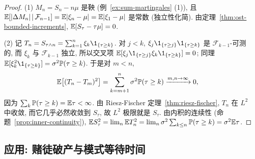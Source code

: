\begin{proof}
(1) $M_n=S_n-n\mu$ 是鞅 (例~\ref{ex:sum-martingales} (1)), 且 $\mathbb{E}[\lvert\Delta M_n\rvert\,|\,\mathcal{F}_{n-1}]=\mathbb{E}\lvert\xi_n-\mu\rvert=\mathbb{E}\lvert\xi_1-\mu\rvert$ 是常数 (独立性化简). 由定理~\ref{thm:ost-bounded-increments}, $\mathbb{E}[S_\tau-\tau\mu]=0$.

(2) 记 $T_n=S_{\tau\wedge n}=\sum_{k=1}^n\xi_k\1_{\{\tau\ge k\}}$. 对 $j<k$, $\xi_j\1_{\{\tau\ge j\}}\1_{\{\tau\ge k\}}$ 是 $\mathcal{F}_{k-1}$-可测的, 而 $\xi_k$ 与 $\mathcal{F}_{k-1}$ 独立, 所以交叉项 $\E[\xi_j\1_{\{\tau\ge j\}}\xi_k\1_{\{\tau\ge k\}}]=0$; 同理 $\E[\xi_k^2\1_{\{\tau\ge k\}}]=\sigma^2\P(\tau\ge k)$. 于是对 $m<n$,
\[
\mathbb{E}\big[(T_n-T_m)^2\big]=\sum_{k=m+1}^n\sigma^2\mathbb{P}(\tau\ge k)\xrightarrow{m,n\to\infty}0,
\]
因为 $\sum_k\mathbb{P}(\tau\ge k)=\mathbb{E}\tau<\infty$. 由 Riesz-Fischer 定理~\ref{thm:riesz-fischer}, $T_n$ 在 $L^2$ 中收敛, 而它几乎必然收敛到 $S_\tau$, 故 $L^2$ 极限就是 $S_\tau$. 由内积的连续性 (命题~\ref{prop:inner-continuity}), $\mathbb{E} S_\tau^2=\lim_n\mathbb{E} T_n^2=\lim_n\sigma^2\sum_{k\le n}\mathbb{P}(\tau\ge k)=\sigma^2\mathbb{E}\tau$.
\end{proof}

\subsection{应用: 赌徒破产与模式等待时间}

